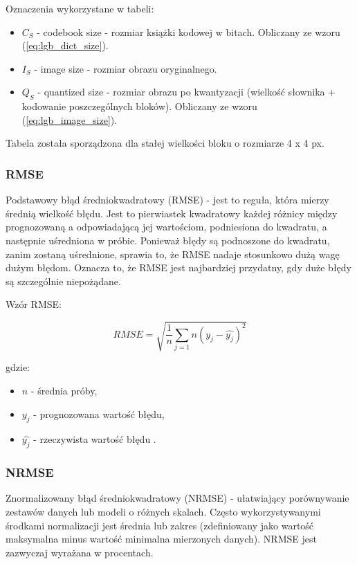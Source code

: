 \documentclass{article}
\begin{document}
Oznaczenia wykorzystane w tabeli:
\begin{itemize}[label=]
	\item $C_S$ - codebook size - rozmiar książki kodowej w bitach. Obliczany ze wzoru (\ref{eq:lgb_dict_size}).
    \item $I_S$ - image size - rozmiar obrazu oryginalnego.
		\item $Q_S$ - quantized size - rozmiar obrazu po kwantyzacji (wielkość słownika + kodowanie poszczególnych bloków). Obliczany ze wzoru (\ref{eq:lgb_image_size}).
\end{itemize}

Tabela została sporządzona dla stałej wielkości bloku o rozmiarze 4 x 4 px.

\subsubsection{RMSE}

Podstawowy błąd średniokwadratowy (RMSE) - jest to reguła, która mierzy średnią wielkość błędu. Jest to pierwiastek kwadratowy każdej różnicy między prognozowaną a odpowiadającą jej wartościom, podniesiona do kwadratu, a następnie uśredniona w próbie. Ponieważ błędy są podnoszone do kwadratu, zanim zostaną uśrednione, sprawia to, że RMSE nadaje stosunkowo dużą wagę dużym błędom. Oznacza to, że RMSE jest najbardziej przydatny, gdy duże błędy są szczególnie niepożądane.

Wzór RMSE:

\begin{equation}
RMSE = \sqrt{\frac{1}{n} \sum_{j=1}{n} (y_{j} - \hat{y_{j}} )^2}
\end{equation}

gdzie:
\begin{itemize}[label=]
    \item $n$ - średnia próby,
    \item $y_{j}$ - prognozowana wartość błędu,
    \item $\hat{y_{j}}$ - rzeczywista wartość błędu \cite{rmse}.
\end{itemize}

\subsubsection{NRMSE}

Znormalizowany błąd średniokwadratowy (NRMSE) - ułatwiający porównywanie zestawów danych lub modeli o różnych skalach. Często wykorzystywanymi środkami normalizacji jest średnia lub zakres (zdefiniowany jako wartość maksymalna minus wartość minimalna mierzonych danych). NRMSE jest zazwyczaj wyrażana w procentach.
\end{document}
